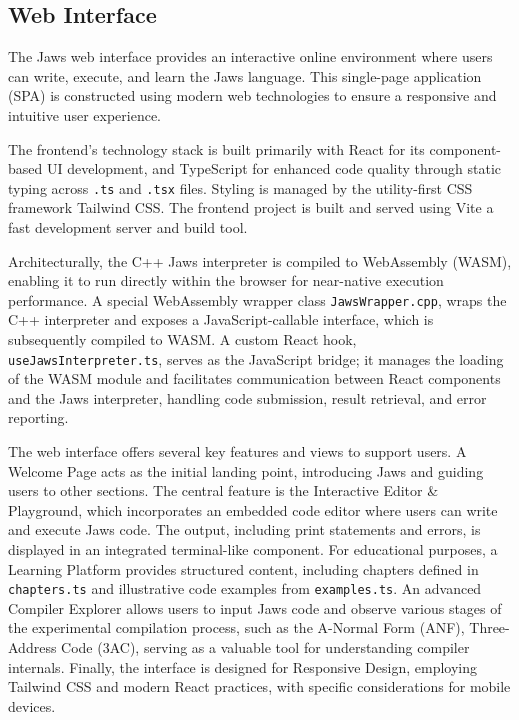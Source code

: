 \documentclass[final]{cmpreport_02}
\begin{document}
\subsection{Web Interface}
The Jaws web interface provides an interactive online environment where users can write, execute, and learn the Jaws language. This single-page application (SPA) is constructed using modern web technologies to ensure a responsive and intuitive user experience.\newline

The frontend's technology stack is built primarily with React for its component-based UI development, and TypeScript for enhanced code quality through static typing across \texttt{.ts} and \texttt{.tsx} files. Styling is managed by the utility-first CSS framework Tailwind CSS. The frontend project is built and served using Vite a fast development server and build tool.\newline

Architecturally, the C++ Jaws interpreter is compiled to WebAssembly (WASM), enabling it to run directly within the browser for near-native execution performance. A special WebAssembly wrapper class \texttt{JawsWrapper.cpp}, wraps the C++ interpreter and exposes a JavaScript-callable interface, which is subsequently compiled to WASM. A custom React hook, \texttt{useJawsInterpreter.ts}, serves as the JavaScript bridge; it manages the loading of the WASM module and facilitates communication between React components and the Jaws interpreter, handling code submission, result retrieval, and error reporting.\newline 

The web interface offers several key features and views to support users. A Welcome Page acts as the initial landing point, introducing Jaws and guiding users to other sections. The central feature is the Interactive Editor \& Playground, which incorporates an embedded code editor where users can write and execute Jaws code. The output, including print statements and errors, is displayed in an integrated terminal-like component. For educational purposes, a Learning Platform provides structured content, including chapters defined in \texttt{chapters.ts} and illustrative code examples from \texttt{examples.ts}. An advanced Compiler Explorer allows users to input Jaws code and observe various stages of the experimental compilation process, such as the A-Normal Form (ANF), Three-Address Code (3AC), serving as a valuable tool for understanding compiler internals. Finally, the interface is designed for Responsive Design, employing Tailwind CSS and modern React practices, with specific considerations for mobile devices.\newline
\end{document}
